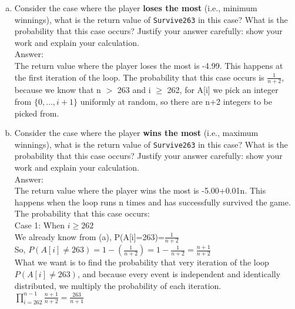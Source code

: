 \documentclass{assignment-263}
\begin{document}
\begin{enumerate}
\begin{enumerate}[(a)]
			\item Consider the case where the player \textbf{loses the most}
				(i.e., minimum winnings), what is the return value of
				\texttt{Survive263} in this case? What is the probability that this case
				occurs? Justify your answer carefully: show your work and
				explain your calculation.\\
Answer:\\
The return value where the player loses the most is -4.99. This happens at the first iteration of the loop. The probability that this case occurs is $\frac{1}{n+2}$, because we know that n $>$ 263 and i $\geq$ 262, for A[i] we pick an integer from $\{0,\ldots, i+1\}$ uniformly at random, so there are n+2 integers to be picked from.\\
			\item Consider the case where the player \textbf{wins the most}
				(i.e., maximum winnings), what is the return value of
				\texttt{Survive263} in this case? What is the probability that this case
				occurs? Justify your answer carefully: show your work and
				explain your calculation.\\
Answer:\\
The return value where the player wins the most is -5.00+0.01n. This happens when the loop runs n times and has successfully survived the game. \\
The probability that this case occurs:\\
Case 1: When $i \geq 262$\\
				We already know from (a), P(A[i]=263)=$\frac{1}{n+2}$\\
				So, $P(A[i]\neq 263) = 1 - (\frac{1}{n+2})= 1 - \frac{1}{n+2} = \frac{n+1}{n+2}$\\
				What we want is to find the probability that very iteration of the loop $P(A[i]\neq 263)$, and because every event is independent and identically distributed, we multiply the probability of each iteration.\\
				$\prod_{i=262}^{n-1} \frac{n+1}{n+2} = \frac{263}{n+1}$\\
				

\end{enumerate}
\end{enumerate}
\end{document}
